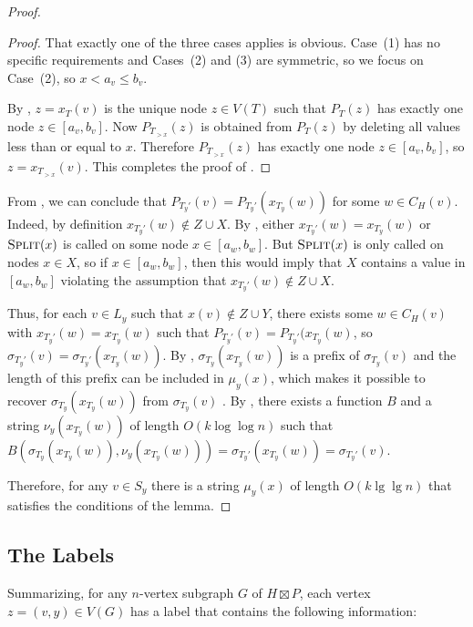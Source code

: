\documentclass[kpfonts]{patmorin}
\let\le\leqslant
\begin{document}
\begin{proof}
  \begin{proof}
    That exactly one of the three cases applies is obvious.  Case~(1) has no specific requirements and Cases~(2) and (3) are symmetric, so we focus on Case~(2), so $x < a_v\le b_v$.
    
    By , $z=x_T(v)$ is the unique node $z\in V(T)$ such that $P_T(z)$ has exactly one node $z\in [a_v,b_v]$.  Now $P_{T_{>x}}(z)$ is obtained from $P_T(z)$ by deleting all values less than or equal to $x$. Therefore $P_{T_{>x}}(z)$ has exactly one node $z\in[a_v,b_v]$, so $z=x_{T_{>x}}(v)$.  This completes the proof of .
  \end{proof}
  
  From , we can conclude that $P_{T_y'}(v)=P_{T_y'}(x_{T_y}(w))$ for some $w\in C_H(v)$.  Indeed, by definition $x_{T_y'}(w)\not\in Z\cup X$. By , either $x_{T_y'}(w)=x_{T_y}(w)$ or $\textsc{Split}(x)$ is called on some node $x\in[a_w,b_w]$.  But $\textsc{Split}(x)$ is only called on nodes $x\in X$, so if $x\in[a_w,b_w]$, then this would imply that $X$ contains a value in $[a_w,b_w]$ violating the assumption that $x_{T_y'}(w)\not\in Z\cup X$.
  
  Thus, for each $v\in L_y$ such that $x(v)\not\in Z\cup Y$, there exists some $w\in C_H(v)$ with $x_{T_y'}(w)=x_{T_y}(w)$ such that $P_{T_y'}(v)=P_{T_y'}(x_{T_y}(w)$, so $\sigma_{T_y'}(v)=\sigma_{T_y'}(x_{T_y}(w))$.  By , $\sigma_{T_y}(x_{T_y}(w))$ is a prefix of $\sigma_{T_y}(v)$ and the length of this prefix can be included in $\mu_y(x)$, which makes it possible to recover $\sigma_{T_y}(x_{T_y}(w))$ from $\sigma_{T_y}(v)$ .  By , there exists a function $B$ and a string $\nu_y(x_{T_y}(w))$ of length $O(k\log\log n)$ such that $B(\sigma_{T_y}(x_{T_y}(w)), \nu_y(x_{T_y}(w))) = \sigma_{T_y'}(x_{T_y}(w)) = \sigma_{T_y'}(v)$.
  
  Therefore, for any $v\in S_y$ there is a string $\mu_y(x)$ of length $O(k\lg\lg n)$ that satisfies the conditions of the lemma.
\end{proof}
  
\subsection{The Labels}

Summarizing, for any $n$-vertex subgraph $G$ of $H\boxtimes P$, each vertex $z=(v,y)\in V(G)$ has a label that contains the following information:
\end{document}
